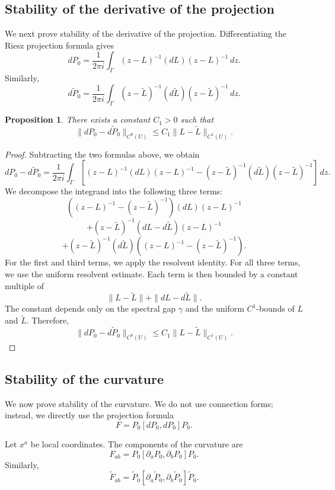 \documentclass[pdflatex,sn-mathphys-num]{sn-jnl}%
\theoremstyle{thmstyleone}%
\newtheorem{proposition}[theorem]{Proposition}%
\theoremstyle{thmstyletwo}%
\theoremstyle{thmstylethree}%
\begin{document}
\begin{appendices}
\subsection{Stability of the derivative of the projection}

We next prove stability of the derivative of the projection. Differentiating the Riesz projection formula gives
\[
dP_0
=
\frac{1}{2\pi i}
\int_\Gamma
(z-L)^{-1}(dL)(z-L)^{-1}\,dz.
\]
Similarly,
\[
d\widetilde P_0
=
\frac{1}{2\pi i}
\int_\Gamma
(z-\widetilde L)^{-1}(d\widetilde L)(z-\widetilde L)^{-1}\,dz.
\]

\begin{proposition}
There exists a constant \(C_1>0\) such that
\[
\|dP_0-d\widetilde P_0\|_{C^0(U)}
\le
C_1\|L-\widetilde L\|_{C^1(U)}.
\]
\end{proposition}

\begin{proof}
Subtracting the two formulas above, we obtain
\[
dP_0-d\widetilde P_0
=
\frac{1}{2\pi i}
\int_\Gamma
\left[
(z-L)^{-1}(dL)(z-L)^{-1}
-
(z-\widetilde L)^{-1}(d\widetilde L)(z-\widetilde L)^{-1}
\right]\,dz.
\]
We decompose the integrand into the following three terms:
\[
\left((z-L)^{-1}-(z-\widetilde L)^{-1}\right)(dL)(z-L)^{-1}
\]
\[
+
(z-\widetilde L)^{-1}(dL-d\widetilde L)(z-L)^{-1}
\]
\[
+
(z-\widetilde L)^{-1}(d\widetilde L)
\left((z-L)^{-1}-(z-\widetilde L)^{-1}\right).
\]
For the first and third terms, we apply the resolvent identity. For all three terms, we use the uniform resolvent estimate. Each term is then bounded by a constant multiple of
\[
\|L-\widetilde L\|+\|dL-d\widetilde L\|.
\]
The constant depends only on the spectral gap \(\gamma\) and the uniform \(C^1\)-bounds of \(L\) and \(\widetilde L\). Therefore,
\[
\|dP_0-d\widetilde P_0\|_{C^0(U)}
\le
C_1\|L-\widetilde L\|_{C^1(U)}.
\]
\end{proof}

\subsection{Stability of the curvature}

We now prove stability of the curvature. We do not use connection forms; instead, we directly use the projection formula
\[
F=P_0[dP_0,dP_0]P_0.
\]

Let \(x^a\) be local coordinates. The components of the curvature are
\[
F_{ab}
=
P_0[\partial_aP_0,\partial_bP_0]P_0.
\]
Similarly,
\[
\widetilde F_{ab}
=
\widetilde P_0[\partial_a\widetilde P_0,\partial_b\widetilde P_0]\widetilde P_0.
\]


\end{appendices}
\end{document}
